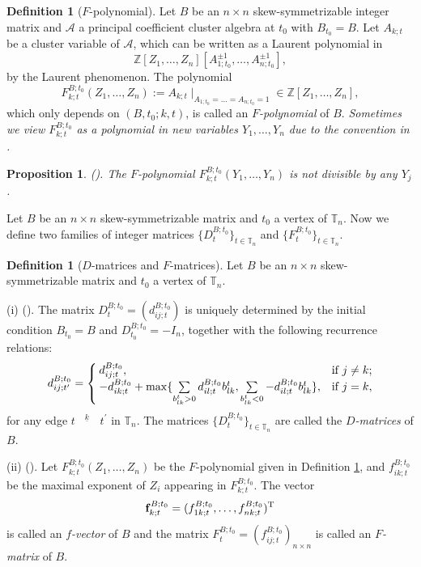 \documentclass{amsart}
\newtheorem{proposition}[theorem]{Proposition}
\theoremstyle{definition}
\newtheorem{definition}[theorem]{Definition}
\theoremstyle{remark}
\numberwithin{equation}{section}
\begin{document}
\begin{definition}[$F$-polynomial]\label{deffp}
Let $B$ be an $n\times n$ skew-symmetrizable integer matrix and $\mathcal A$  a principal coefficient cluster algebra at $t_0$ with $B_{t_0}=B$.
 Let $A_{k;t}$ be a cluster variable of $\mathcal A$, which can be written as  a Laurent polynomial in $$\mathbb Z[Z_1,\ldots,Z_n][A_{1;t_0}^{\pm1},\ldots,A_{n;t_0}^{\pm1}],$$ by the Laurent phenomenon. The polynomial
$$F_{k;t}^{B;t_0}(Z_1,\ldots,Z_n):=A_{k;t}\mid _{A_{1;t_0}=\ldots=A_{n;t_0}=1}\in\mathbb Z[Z_1,\ldots,Z_n],$$
which only depends on $(B,t_0;k,t)$, is called an {\em $F$-polynomial} of $B$.
{\em Sometimes we view $F_{k;t}^{B;t_0}$ as a polynomial in new variables $Y_1,\ldots,Y_n$ due to the convention in  \cite{FZ3}. }
\end{definition}
\begin{proposition}{\rm (}\cite[Proposition 5.2]{FZ3}{\rm ).} \label{profy}The $F$-polynomial
$F_{k;t}^{B;t_0}(Y_1,\ldots,Y_n)$ is not divisible by any $Y_j$.
\end{proposition}


Let $B$ be an $n\times n$ skew-symmetrizable matrix and $t_0$  a vertex of $\mathbb T_n$. Now we define two families of integer matrices $\{D_t^{B;t_0}\}_{t\in\mathbb T_n}$ and $\{F_t^{B;t_0}\}_{t\in\mathbb T_n}$.
\begin{definition}[$D$-matrices and $F$-matrices] \label{defdf}
Let $B$ be an $n\times n$ skew-symmetrizable matrix and $t_0$  a vertex of $\mathbb T_n$.

(i) {\rm (}\cite[(7.6), (7.7)]{FZ3}{\rm ).} The matrix $D_t^{B;t_0}=(d_{ij;t}^{B;t_0})$ is uniquely determined by the initial condition $B_{t_0}=B$ and $D_{t_0}^{B;t_0}=-I_n$, together with the following recurrence relations:
\begin{equation}
d_{ij;t^\prime}^{B;t_0}=\begin{cases}d_{ij;t}^{B;t_0},  & \text{if } j\neq k;\\
-d_{ik;t}^{B;t_0}+{\rm max}\{\sum\limits_{b_{lk}^t>0}d_{il;t}^{B;t_0} b_{lk}^t, \sum\limits_{b_{lk}^t<0} -d_{il;t}^{B;t_0}b_{lk}^t\},  &\text{if } j=k,\end{cases}\nonumber
 \end{equation}
 for any edge $t^{~\underline{\quad k \quad}}~ t^{\prime}$ in $\mathbb T_n$. The matrices $\{D_t^{B;t_0}\}_{t\in\mathbb T_n}$ are called the {\em $D$-matrices} of $B$.

(ii) {\rm (}\cite[Definition 2.6]{FG1}{\rm ).} Let $F_{k;t}^{B;t_0}(Z_1,\ldots,Z_n)$ be the $F$-polynomial given in Definition \ref{deffp}, and $f_{ik;t}^{B;t_0}$ be the maximal exponent of $Z_i$ appearing in $F_{k;t}^{B;t_0}$. The vector $${\bf f}_{k;t}^{B;t_0}=(f_{1k;t}^{B;t_0},\ldots,f_{nk;t}^{B;t_0})^{\rm T}$$ is called an {\em $f$-vector} of $B$ and the matrix $F_t^{B;t_0}=(f_{ij;t}^{B;t_0})_{n\times n}$ is called an {\em $F$-matrix} of $B$.
\end{definition}
\end{document}
